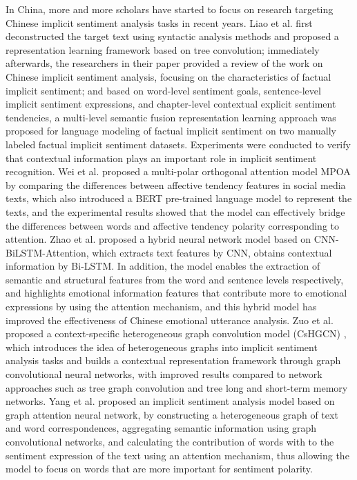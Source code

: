 In China, more and more scholars have started to focus on research targeting Chinese implicit sentiment analysis tasks in recent years.
Liao et al.\cite{liao2017freerl} first deconstructed the target text using syntactic analysis methods and proposed a representation learning framework based on tree convolution; immediately afterwards, the researchers in their paper \cite{LiaoJian2018,liao2019identification} provided a review of the work on Chinese implicit sentiment analysis, focusing on the characteristics of factual implicit sentiment; and based on word-level sentiment goals, sentence-level implicit sentiment expressions, and chapter-level contextual explicit sentiment tendencies, a multi-level semantic fusion representation learning approach was proposed for language modeling of factual implicit sentiment on two manually labeled factual implicit sentiment datasets. Experiments were conducted to verify that contextual information plays an important role in implicit sentiment recognition.
Wei et al. \cite{wei2020BiLSTM} proposed a multi-polar orthogonal attention model MPOA by comparing the differences between affective tendency features in social media texts, which also introduced a BERT pre-trained language model to represent the texts, and the experimental results showed that the model can effectively bridge the differences between words and affective tendency polarity corresponding to attention.
Zhao et al.\cite {ZhaoRongMei2020} proposed a hybrid neural network model based on CNN-BiLSTM-Attention, which extracts text features by CNN, obtains contextual information by Bi-LSTM. In addition, the model enables the extraction of semantic and structural features from the word and sentence levels respectively,  and highlights emotional information features that contribute more to emotional expressions by using the attention mechanism, and this hybrid model has improved the effectiveness of Chinese emotional utterance analysis.
Zuo et al. \cite{zuo2020context} proposed a context-specific heterogeneous graph convolution model (CsHGCN) , which introduces the idea of heterogeneous graphs into implicit sentiment analysis tasks and builds a contextual representation framework through graph convolutional neural networks, with improved results compared to network approaches such as tree graph convolution and tree long and short-term memory networks.
Yang et al. \cite {YangShanLiang2021} proposed an implicit sentiment analysis model based on graph attention neural network, by constructing a heterogeneous graph of text and word correspondences, aggregating semantic information using graph convolutional networks, and calculating the contribution of words with to the sentiment expression of the text using an attention mechanism, thus allowing the model to focus on words that are more important for sentiment polarity.
